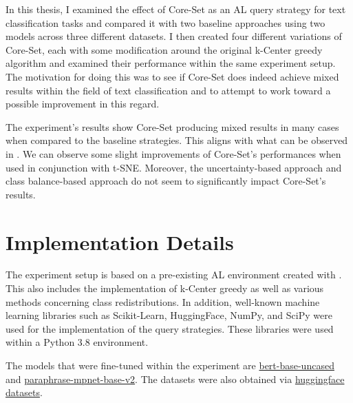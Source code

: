 \documentclass[english,bachelor,ul]{webisthesis} %
\begin{document}
In this thesis, I examined the effect of Core-Set as an AL query strategy for text classification tasks and compared it with two baseline approaches using two models across three different datasets. I then created four different variations of Core-Set, each with some modification around the original k-Center greedy algorithm and examined their performance within the same experiment setup. The motivation for doing this was to see if Core-Set does indeed achieve mixed results within the field of text classification and to attempt to work toward a possible improvement in this regard.

The experiment's results show Core-Set producing mixed results in many cases when compared to the baseline strategies. This aligns with what can be observed in \cite{DBLP:conf/kdd/0002MM21}. We can observe some slight improvements of Core-Set's performances when used in conjunction with t-SNE. Moreover, the uncertainty-based approach and class balance-based approach do not seem to significantly impact Core-Set's results.






%
%

%

\appendix
\chapter{Implementation Details}

The experiment setup is based on a pre-existing AL environment created with \cite{schroeder2023small-text}. This also includes the implementation of k-Center greedy as well as various methods concerning class redistributions. In addition, well-known machine learning libraries such as Scikit-Learn, HuggingFace, NumPy, and SciPy were used for the implementation of the query strategies. These libraries were used within a Python 3.8 environment.

The models that were fine-tuned within the experiment are \href{https://huggingface.co/google-bert/bert-base-uncased}{bert-base-uncased} and \href{https://huggingface.co/sentence-transformers/paraphrase-mpnet-base-v2}{
paraphrase-mpnet-base-v2}. The datasets were also obtained via \href{https://github.com/huggingface/datasets}{huggingface datasets}.

\end{document}
